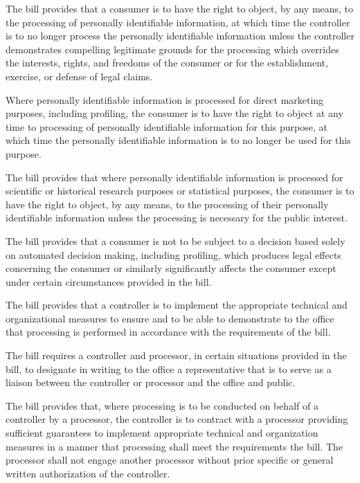      The bill provides that a consumer is to have the right to object, by any means, to the processing of personally identifiable information, at which time the controller is to no longer process the personally identifiable information unless the controller demonstrates compelling legitimate grounds for the processing which overrides the interests, rights, and freedoms of the consumer or for the establishment, exercise, or defense of legal claims.

     Where personally identifiable information is processed for direct marketing purposes, including profiling, the consumer is to have the right to object at any time to processing of personally identifiable information for this purpose, at which time the personally identifiable information is to no longer be used for this purpose.

     The bill provides that where personally identifiable information is processed for scientific or historical research purposes or statistical purposes, the consumer is to have the right to object, by any means, to the processing of their personally identifiable information unless the processing is necessary for the public interest.

     The bill provides that a consumer is not to be subject to a decision based solely on automated decision making, including profiling, which produces legal effects concerning the consumer or similarly significantly affects the consumer except under certain circumstances provided in the bill.

     The bill provides that a controller is to implement the appropriate technical and organizational measures to ensure and to be able to demonstrate to the office that processing is performed in accordance with the requirements of the bill.

     The bill requires a controller and processor, in certain situations provided in the bill, to designate in writing to the office a representative that is to serve as a liaison between the controller or processor and the office and public.

     The bill provides that, where processing is to be conducted on behalf of a controller by a processor, the controller is to contract with a processor providing sufficient guarantees to implement appropriate technical and organization measures in a manner that processing shall meet the requirements the bill. The processor shall not engage another processor without prior specific or general written authorization of the controller.

